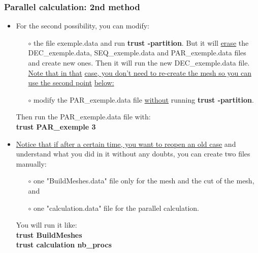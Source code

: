 \documentclass[10pt, hyperref={unicode=true,pdfusetitle, bookmarks=true,bookmarksnumbered=false,bookmarksopen=false, breaklinks=false,pdfborder={0 0 1},backref=true,colorlinks=true,linkcolor=darkblue,pageanchor}]{beamer}
\begin{document}
\begin{frame}
\frametitle{Parallel calculation: 2nd method}
\begin{block}{}

\begin{itemize}
\item For the second possibility, you can modify:
    \begin{itemize}
    \item [$\circ$] the file exemple.data and run \textbf{trust -partition}. But it will \underline{erase} the DEC\_exemple.data, SEQ\_exemple.data and PAR\_exemple.data files and create new ones. Then it will run the new DEC\_exemple.data file. \underline{Note that in that} \underline{case, you don't need to re-create the mesh so you can use the second point} \underline{below:}
    \item [$\circ$] modify the PAR\_exemple.data file \underline{without} running \textbf{trust -partition}.
    \end{itemize}
Then run the PAR\_exemple.data file with:\\
\textbf{trust PAR\_exemple 3}

\item \underline{Notice that if after a certain time, you want to reopen an old case} and understand what you did in it without any doubts, you can create two files manually:
    \begin{itemize} 
    \item [$\circ$] one "BuildMeshes.data" file only for the mesh and the cut of the mesh, and
    \item [$\circ$] one "calculation.data" file for the parallel calculation.
    \end{itemize}
You will run it like:\\
\textbf{trust BuildMeshes}\\
\textbf{trust calculation nb\_procs}\\
\end{itemize}

\end{block}
\end{frame}
\end{document}
